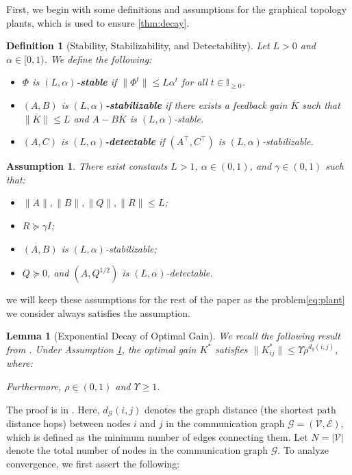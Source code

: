 \documentclass[conference]{IEEEtran}
\newtheorem{lemma}{Lemma}
\newtheorem{assumption}{Assumption}
\newtheorem{definition}{Definition}
\begin{document}
First, we begin with some definitions and assumptions for the graphical topology plants, which is used to ensure \ref{thm:decay}.
\begin{definition}[Stability, Stabilizability, and Detectability]
\label{def:stability}
Let $L > 0$ and $\alpha \in [0, 1)$. We define the following:
\begin{itemize}
    \item[(a)] $\Phi$ is \textbf{$(L, \alpha)$-stable} if $\|\Phi^t\| \leq L\alpha^t$ for all $t \in \mathbb{I}_{\geq 0}$.
    \item[(b)] $(A, B)$ is \textbf{$(L, \alpha)$-stabilizable} if there exists a feedback gain $\overline{K}$ such that $\|\overline{K}\| \leq L$ and $A - B\overline{K}$ is $(L, \alpha)$-stable.
    \item[(c)] $(A, C)$ is \textbf{$(L, \alpha)$-detectable} if $(A^\top, C^\top)$ is $(L, \alpha)$-stabilizable.
\end{itemize}
\end{definition}

\begin{assumption}
\label{as:system_params}
There exist constants $L > 1$, $\alpha \in (0, 1)$, and $\gamma \in (0, 1)$ such that:
\begin{itemize}
    \item[(a)] $\|A\|, \|B\|, \|Q\|, \|R\| \leq L$;
    \item[(b)] $R \succeq \gamma I$;
    \item[(c)] $(A, B)$ is $(L, \alpha)$-stabilizable;
    \item[(d)] $Q \succeq 0$, and $(A, Q^{1/2})$ is $(L, \alpha)$-detectable.
\end{itemize}
\end{assumption}
we will keep these assumptions for the rest of the paper as the problem\ref{eq:plant} we consider always satisfies the assumption.
\begin{lemma}[Exponential Decay of Optimal Gain]
We recall the following result from \cite{shin}.
\label{lemm:decay}
Under Assumption \ref{as:system_params}, the optimal gain $K^*$ satisfies $\|K^*_{ij}\| \leq \Upsilon \rho^{d_g(i,j)}$, where:

Furthermore, $\rho \in (0, 1)$ and $\Upsilon \geq 1$.
\end{lemma}
The proof is in \cite{shin}. Here, $d_{\mathcal{G}}(i, j)$ denotes the graph distance (the shortest path distance hops) between nodes $i$ and $j$ in the communication graph $\mathcal{G} = (\mathcal{V}, \mathcal{E})$, which is defined as the minimum number of edges connecting them. Let $N = |\mathcal{V}|$ denote the total number of nodes in the communication graph $\mathcal{G}$.
To analyze convergence, we first assert the following:
\end{document}
